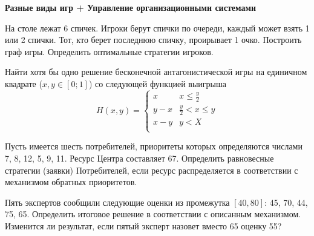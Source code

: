 \documentclass[a4paper,12pt]{extarticle}
\begin{document}
\begin{enumerate}
  {\item[]
          \bfseries Разные виды игр + Управление организационными системами
          \par\vspace{1mm}
  }

  \item 
  На столе лежат 6 спичек. Игроки берут спички по очереди, каждый может взять 1 или 2 спички. Тот, кто берет последнюю спичку, проирывает 1 очко. 
  Построить граф игры. Определить оптимальные стратегии игроков.

\item 
  Найти хотя бы одно решение бесконечной антагонистической игры на единичном квадрате (\(x,y\in [0;1]\)) со следующей функцией выигрыша
  \[
    H(x,y) = \begin{cases}
      x   & x\leqslant \frac{y}{2}\\
      y-x & \frac{y}{2} < x \leqslant y\\
      x-y &  y < X\\
    \end{cases}
  \]
    
  \item 
  Пусть имеется шесть потребителей, приоритеты которых определяются числами 7, 8, 12, 5, 9, 11. 
  Ресурс Центра составляет 67. 
  Определить равновесные стратегии (заявки) Потребителей, если ресурс распределяется в соответствии с механизмом обратных приоритетов.
  

  \item 
  Пять экспертов сообщили следующие оценки из промежутка $[40,80]$: 45, 70, 44, 75, 65. 
  Определить итоговое решение в соответствии с описанным механизмом. 
  Изменится ли результат, если пятый эксперт назовет вместо 65 оценку 55?


\end{enumerate}
\end{document}
